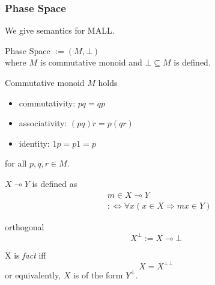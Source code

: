\documentclass[dvipdfmx,cjk]{beamer}
\theoremstyle{example}
\begin{document}
\begin{frame}
  \frametitle{Phase Space}

  We give semantics for MALL.
  \begin{definition}{Phase Space $ := (M, \bot) $} \\
    where $M$ is commutative monoid and $\bot \subseteq M$ is defined.
  \end{definition}

  \begin{definition}{Commutative monoid $M$} holds \\
    \begin{itemize}
      \item commutativity: $pq = qp$
      \item associativity: $(pq)r = p(qr)$
      \item identity: $1p = p1 = p$
    \end{itemize}
    for all $p, q, r \in M$.
  \end{definition}
  
\end{frame}

\begin{frame}
  
  \begin{definition}{$X \multimap Y$}
    is defined as 
    \begin{align*}
      & m \in X \multimap Y \\
      & :\Leftrightarrow \forall x (x \in X \Rightarrow mx \in Y)
    \end{align*}
  \end{definition}

  \begin{definition}{orthogonal}
    \[
      X^\bot := X \multimap \bot
    \]
  \end{definition}

  \begin{definition}{X is \textit{fact}} iff
    \[
     X = X^{\bot\bot}
    \]
    or equivalently, $X$ is of the form $Y^\bot$.
  \end{definition}
\end{frame}
\end{document}
